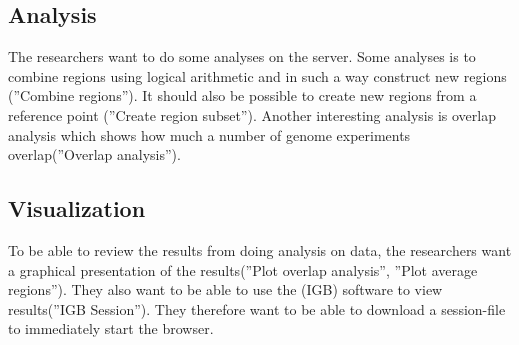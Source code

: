 \subsection{Analysis}
The researchers want to do some analyses on the server. Some analyses is to combine regions using logical arithmetic and in such a way construct new regions (''Combine regions''). It should also be possible to create new regions from a reference point (''Create region subset''). Another interesting analysis is overlap analysis which shows how much a number of genome experiments overlap(''Overlap analysis'').

\subsection{Visualization}
To be able to review the results from doing analysis on data,  the researchers want a graphical presentation of the results(''Plot overlap analysis'', ''Plot average regions''). They also want to be able to use the  (IGB) software to view results(''IGB Session''). They therefore want to be able to download a session-file to immediately start the browser. 